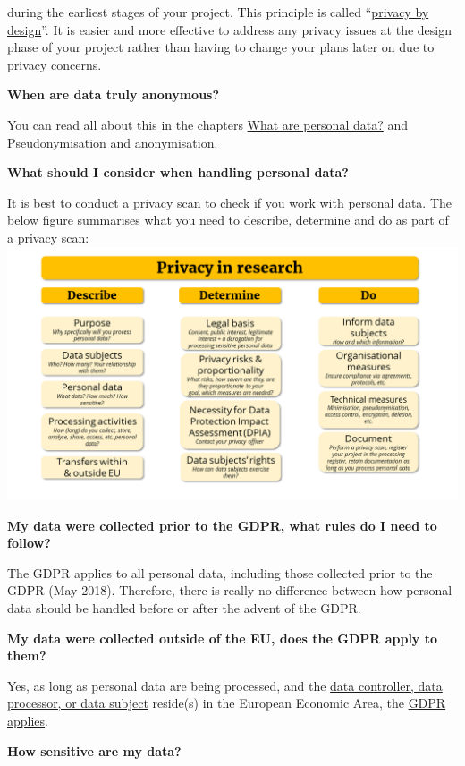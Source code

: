 \documentclass[
]{book}
\begin{document}
during the earliest stages of your project. This principle is called ``\protect\hyperlink{privacy-by-design}{privacy by design}''. It is easier and more effective to address any privacy issues at the design phase of your project rather than having to change your plans later on due to privacy concerns.

\textbf{When are data truly anonymous?}

You can read all about this in the chapters \protect\hyperlink{personal-data}{What are personal data?} and \protect\hyperlink{pseudonymisation-anonymisation}{Pseudonymisation and anonymisation}.

\textbf{What should I consider when handling personal data?}

It is best to conduct a \protect\hyperlink{privacy-scan}{privacy scan} to check if you work with personal data. The below figure summarises what you need to describe, determine and do as part of a privacy scan: \includegraphics{img/privacyscan_infograph.png}

\textbf{My data were collected prior to the GDPR, what rules do I need to follow?}

The GDPR applies to all personal data, including those collected prior to the GDPR (May 2018). Therefore, there is really no difference between how personal data should be handled before or after the advent of the GDPR.

\textbf{My data were collected outside of the EU, does the GDPR apply to them?}

Yes, as long as personal data are being processed, and the \protect\hyperlink{definitions}{data controller, data processor, or data subject} reside(s) in the European Economic Area, the \protect\hyperlink{gdpr-scope}{GDPR applies}.~

\textbf{How sensitive are my data?}
\end{document}
